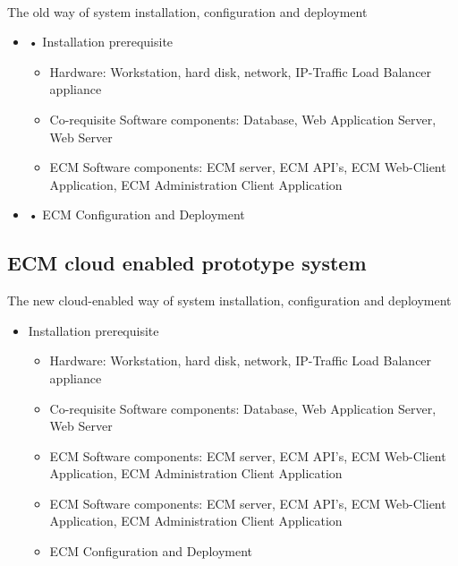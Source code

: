 \documentclass[EPiC]{easychair} %
\begin{document}
\paragraph{} The old way of system installation, configuration and deployment

\begin{itemize}
    \item •	Installation prerequisite
    \begin{itemize}
        \item Hardware: Workstation, hard disk, network, IP-Traffic Load Balancer appliance
        \item Co-requisite Software components: Database, Web Application Server, Web Server
        \item ECM Software components: ECM server, ECM API’s, ECM Web-Client Application, ECM Administration Client Application 
    \end{itemize}
    \item •	ECM Configuration and Deployment 
\end{itemize}

\subsection{ECM cloud enabled prototype system }

The new cloud-enabled way of system installation, configuration and deployment

\begin{itemize}
    \item Installation prerequisite
    \begin{itemize}
        \item Hardware: Workstation, hard disk, network, IP-Traffic Load Balancer appliance
        \item Co-requisite Software components: Database, Web Application Server, Web Server
        \item ECM Software components: ECM server, ECM API’s, ECM Web-Client Application, ECM Administration Client Application 
    \item ECM Software components: ECM server, ECM API’s, ECM Web-Client Application, ECM Administration Client Application 
    \item ECM Configuration and Deployment
    \end{itemize}
\end{itemize}

\end{document}
